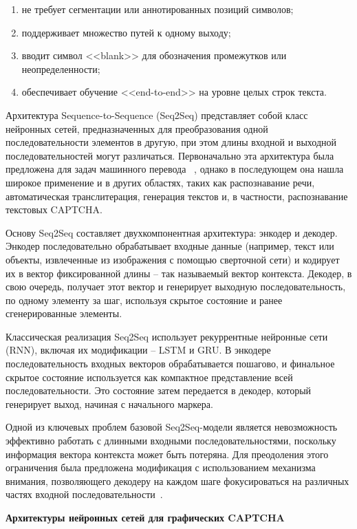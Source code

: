 \begin{enumerate}
    \item не требует сегментации или аннотированных позиций символов;
    \item поддерживает множество путей к одному выходу;
    \item вводит символ <<blank>> для обозначения промежутков или 
    неопределенности;
    \item обеспечивает обучение <<end-to-end>> на уровне целых строк текста.
\end{enumerate}

Архитектура Sequence-to-Sequence (Seq2Seq) представляет собой класс нейронных 
сетей, предназначенных для преобразования одной последовательности элементов в 
другую, при этом длины входной и выходной последовательностей могут различаться. 
Первоначально эта архитектура была предложена для задач машинного перевода
~\cite{seq2seq}, однако в последующем она нашла широкое применение и в других 
областях, таких как распознавание речи, автоматическая транслитерация, генерация 
текстов и, в частности, распознавание текстовых CAPTCHA.

Основу Seq2Seq составляет двухкомпонентная архитектура: энкодер и декодер. 
Энкодер последовательно обрабатывает входные данные (например, текст или объекты, 
извлеченные из изображения с помощью сверточной сети) и кодирует их в вектор 
фиксированной длины -- так называемый вектор контекста. Декодер, в свою очередь, 
получает этот вектор и генерирует выходную последовательность, по одному элементу 
за шаг, используя скрытое состояние и ранее сгенерированные элементы.

Классическая реализация Seq2Seq использует рекуррентные нейронные сети (RNN), 
включая их модификации -- LSTM и GRU. В энкодере последовательность входных 
векторов обрабатывается пошагово, и финальное скрытое состояние используется как 
компактное представление всей последовательности. Это состояние затем передается 
в декодер, который генерирует выход, начиная с начального маркера.

Одной из ключевых проблем базовой Seq2Seq-модели является невозможность 
эффективно работать с длинными входными последовательностями, поскольку 
информация вектора контекста может быть потеряна. Для преодоления этого 
ограничения была предложена модификация с использованием механизма внимания, 
позволяющего декодеру на каждом шаге фокусироваться на различных частях входной 
последовательности~\cite{seq2seqattention}.

\textbf{Архитектуры нейронных сетей для графических CAPTCHA}

